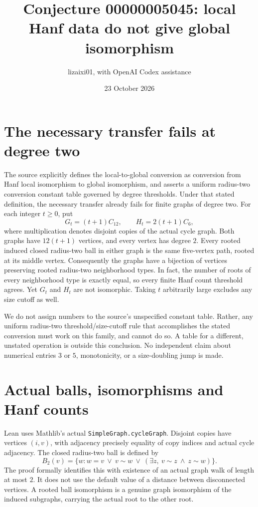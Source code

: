 \documentclass[11pt]{article}
\title{Conjecture 00000005045: local Hanf data do not give global isomorphism}
\author{lizaixi01, with OpenAI Codex assistance}
\date{23 October 2026}
\begin{document}
\maketitle
\section{The necessary transfer fails at degree two}
The source explicitly defines the local-to-global conversion as
conversion from Hanf local isomorphism to global isomorphism, and
asserts a uniform radius-two conversion constant table governed by
degree thresholds. Under that stated definition, the necessary
transfer already fails for finite graphs of degree two. For each
integer $t\geq0$, put
\[
 G_t=(t+1)C_{12},\qquad H_t=2(t+1)C_6,
\]
where multiplication denotes disjoint copies of the actual cycle
graph. Both graphs have $12(t+1)$ vertices, and every vertex has
degree $2$. Every rooted induced closed radius-two ball in either
graph is the same five-vertex path, rooted at its middle vertex.
Consequently the graphs have a bijection of vertices preserving
rooted radius-two neighborhood types. In fact, the number of roots
of every neighborhood type is exactly equal, so every finite Hanf
count threshold agrees. Yet $G_t$ and $H_t$ are not isomorphic.
Taking $t$ arbitrarily large excludes any size cutoff as well.

We do not assign numbers to the source's unspecified constant
table. Rather, any uniform radius-two threshold/size-cutoff rule
that accomplishes the stated conversion must work on this family,
and cannot do so. A table for a different, unstated operation is
outside this conclusion. No independent claim about numerical
entries $3$ or $5$, monotonicity, or a size-doubling jump is made.

\section{Actual balls, isomorphisms and Hanf counts}
Lean uses Mathlib's actual \texttt{SimpleGraph.cycleGraph}.
Disjoint copies have vertices $(i,v)$, with adjacency precisely
equality of copy indices and actual cycle adjacency. The closed
radius-two ball is defined by
\[
 B_2(v)=\{w:w=v\ \lor\ v\sim w\ \lor\
                 (\exists z,\ v\sim z\ \land\ z\sim w)\}.
\]
The proof formally identifies this with existence of an actual
graph walk of length at most $2$. It does not use the default
value of a distance between disconnected vertices. A rooted ball
isomorphism is a genuine graph isomorphism of the induced
subgraphs, carrying the actual root to the other root.
\end{document}
